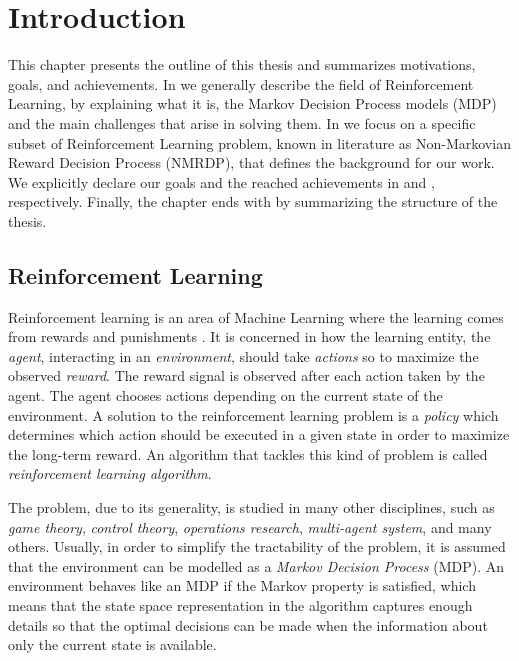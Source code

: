 \chapter{Introduction}
This chapter presents the outline of this thesis and summarizes motivations, goals, and achievements. In  we generally describe the field of Reinforcement Learning, by explaining what it is, the Markov Decision Process models (MDP) and the main challenges that arise in solving them. In  we focus on a specific subset of Reinforcement Learning problem, known in literature as Non-Markovian Reward Decision Process (NMRDP), that defines the background for our work. We explicitly declare our goals and the reached achievements in  and , respectively. Finally, the chapter ends with  by summarizing the structure of the thesis.

\section{Reinforcement Learning}\label{sect:intro-rl}
Reinforcement learning is an area of Machine Learning where the learning comes from rewards and punishments \citep{Sutton:1998:IRL:551283}. It is concerned in how the learning entity, the \emph{agent}, interacting in an \emph{environment}, should take \emph{actions} so to maximize the observed \emph{reward}. The reward signal is observed after each action taken by the agent. The agent chooses actions depending on the current state of the environment. A solution to the reinforcement learning problem is a \emph{policy} which determines which action should
be executed in a given state in order to maximize the long-term reward. An algorithm that tackles this kind of problem is called \emph{reinforcement learning algorithm}.

\medskip
The problem, due to its generality, is studied in many other disciplines, such as \emph{game theory}, \emph{control theory}, \emph{operations research}, \emph{multi-agent system}, and many others. Usually, in order to simplify the tractability of the problem, it is assumed that the environment can be modelled as a \emph{Markov Decision Process} (MDP). An environment behaves like an MDP if the Markov property is satisfied, which means that the state space representation in the algorithm captures enough details so that the optimal decisions can be made when the information about only the current state is available. 


